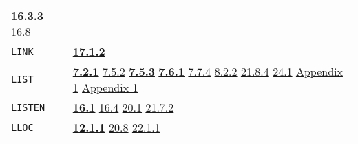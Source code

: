 \documentclass[a4paper,]{article}
\begin{document}
\begin{longtable}[]{@{}ll@{}}
\begin{minipage}[t]{0.70\columnwidth}
\textbf{\href{16-errors-frames-etc.md\#1633-frame-the-subr}{16.3.3}}
\href{16-errors-frames-etc.md\#168-control-s-s}{16.8}\strut
\end{minipage}\tabularnewline
\begin{minipage}[t]{0.24\columnwidth}\raggedright\strut
\texttt{LINK}\strut
\end{minipage} & \begin{minipage}[t]{0.70\columnwidth}\raggedright\strut
\textbf{\href{17-macro-operations.md\#1712-link}{17.1.2}}\strut
\end{minipage}\tabularnewline
\begin{minipage}[t]{0.24\columnwidth}\raggedright\strut
\texttt{LIST}\strut
\end{minipage} & \begin{minipage}[t]{0.70\columnwidth}\raggedright\strut
\textbf{\href{07-structured-objects.md\#721-list-1}{7.2.1}} \href{07-structured-objects.md\#752-quote-1}{7.5.2}
\textbf{\href{07-structured-objects.md\#753-list-vector-uvector-and-string-the-subrs-1}{7.5.3}}
\textbf{\href{07-structured-objects.md\#761-list-the-primtype-1}{7.6.1}}
\href{07-structured-objects.md\#774-note-on-efficiency-1}{7.7.4} \href{08-truth.md\#822-equality-and-membership-1}{8.2.2}
\href{21-interrupts.md\#2184-gc}{21.8.4} \href{24-efficiency-and-tastefulness.md\#241-efficiency}{24.1}
\href{appendix-1-a-look-inside.md\#appendix-1-a-look-inside}{Appendix 1}
\href{appendix-1-a-look-inside.md\#basic-data-structures}{Appendix 1}\strut
\end{minipage}\tabularnewline
\begin{minipage}[t]{0.24\columnwidth}\raggedright\strut
\texttt{LISTEN}\strut
\end{minipage} & \begin{minipage}[t]{0.70\columnwidth}\raggedright\strut
\textbf{\href{16-errors-frames-etc.md\#161-listen}{16.1}} \href{16-errors-frames-etc.md\#164-erret}{16.4}
\href{20-coroutines.md\#201-process-the-type}{20.1} \href{21-interrupts.md\#2172-int-level}{21.7.2}\strut
\end{minipage}\tabularnewline
\begin{minipage}[t]{0.24\columnwidth}\raggedright\strut
\texttt{LLOC}\strut
\end{minipage} & \begin{minipage}[t]{0.70\columnwidth}\raggedright\strut
\textbf{\href{12-locatives.md\#1211-lloc}{12.1.1}} \href{20-coroutines.md\#208-sneakiness-with-processes}{20.8}
\href{22-storage-management.md\#2211-stacks-and-other-internal-vectors}{22.1.1}\strut

\end{minipage}
\end{longtable}
\end{document}

